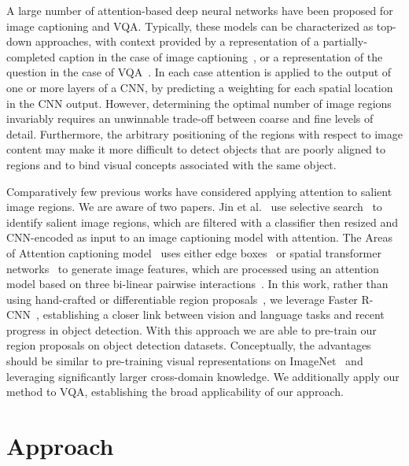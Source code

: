 \documentclass[10pt,twocolumn,letterpaper]{article}
\begin{document}
A large number of attention-based deep neural networks have been proposed for image captioning and VQA. Typically, these models can be characterized as top-down approaches, with context provided by a representation of a partially-completed caption in the case of image captioning~\cite{scst2016,sentinel,reviewnet,Xu2015}, or a representation of the question in the case of VQA~\cite{fukui2016multimodal,coatt,askattend,stacked,visual7w}. In each case attention is applied to the output of one or more layers of a CNN, by predicting a weighting for each spatial location in the CNN output. However, determining the optimal number of image regions invariably requires an unwinnable trade-off between coarse and fine levels of detail. Furthermore, the arbitrary positioning of the regions with respect to image content may make it more difficult to detect objects that are poorly aligned to regions and to bind visual concepts associated with the same object. 

Comparatively few previous works have considered applying attention to salient image regions. We are aware of two papers. Jin et al.~\cite{factorization} use selective search~\cite{selective} to identify salient image regions, which are filtered with a classifier then resized and CNN-encoded as input to an image captioning model with attention. The Areas of Attention captioning model~\cite{areas} uses either edge boxes~\cite{edge} or spatial transformer networks~\cite{stn} to generate image features, which are processed using an attention model based on three bi-linear pairwise interactions~\cite{areas}. In this work, rather than using hand-crafted or differentiable region proposals~\cite{selective,edge,stn}, we leverage Faster R-CNN~\cite{faster_rcnn}, establishing a closer link between vision and language tasks and recent progress in object detection. With this approach we are able to pre-train our region proposals on object detection datasets. Conceptually, the advantages should be similar to pre-training visual representations on ImageNet~\cite{ILSVRC15} and leveraging significantly larger cross-domain knowledge. We additionally apply our method to VQA, establishing the broad applicability of our approach.





\section{Approach}
\label{sec:approach}
\end{document}
